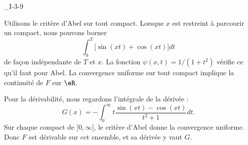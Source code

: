

\begin{corrige}{_I-3-9}

Utilisons le critère d'Abel sur tout compact. Lorsque $x$ est restreint à parcourir un compact, nous pouvons borner
\begin{equation}
	\int_0^T\big[ \sin(xt)+\cos(xt) \big]dt
\end{equation}
de façon indépendante de $T$ et $x$. La fonction $\psi(x,t)=1/(1+t^2)$ vérifie ce qu'il faut pour Abel. La convergence uniforme sur tout compact implique la continuité de $F$ sur $\eR$.

Pour la dérivabilité, nous regardons l'intégrale de la dérivée :
\begin{equation}
	G(x)=-\int_0^{\infty}t\frac{ \sin(xt)-\cos(xt) }{ t^2+1 }dt.
\end{equation}
Sur chaque compact de $]0,\infty[$, le critère d'Abel donne la convergence uniforme. Donc $F$ est dérivable sur cet ensemble, et sa dérivée y vaut $G$.

\end{corrige}
